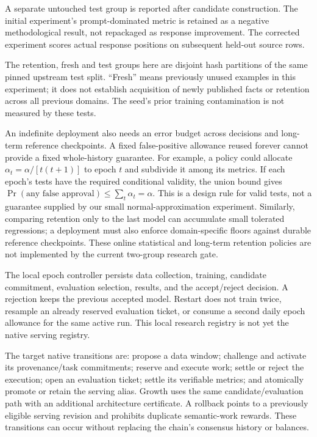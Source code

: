 \documentclass[11pt]{article}
\begin{document}
A separate untouched test group is reported after candidate construction. The initial experiment's prompt-dominated metric is retained as a negative methodological result, not repackaged as response improvement. The corrected experiment scores actual response positions on subsequent held-out source rows.

The retention, fresh and test groups here are disjoint hash partitions of the
same pinned upstream test split. ``Fresh'' means previously unused examples in
this experiment; it does not establish acquisition of newly published facts or
retention across all previous domains. The seed's prior training contamination
is not measured by these tests.

An indefinite deployment also needs an error budget across decisions and
long-term reference checkpoints. A fixed false-positive allowance reused
forever cannot provide a fixed whole-history guarantee. For example, a
policy could allocate $\alpha_t=\alpha/[t(t+1)]$ to epoch $t$ and subdivide it
among its metrics. If each epoch's tests have the required conditional validity,
the union bound gives $\Pr(\text{any false approval})\leq\sum_t\alpha_t=\alpha$.
This is a design rule for valid tests, not a guarantee supplied by our small
normal-approximation experiment. Similarly, comparing retention only to the
last model can accumulate small tolerated regressions; a deployment must also
enforce domain-specific floors against durable reference checkpoints. These
online statistical and long-term retention policies are not implemented by the
current two-group research gate.

The local epoch controller persists data collection, training, candidate commitment, evaluation selection, results, and the accept/reject decision. A rejection keeps the previous accepted model. Restart does not train twice, resample an already reserved evaluation ticket, or consume a second daily epoch allowance for the same active run. This local research registry is not yet the native serving registry.

The target native transitions are: propose a data window; challenge and activate its provenance/task commitments; reserve and execute work; settle or reject the execution; open an evaluation ticket; settle its verifiable metrics; and atomically promote or retain the serving alias. Growth uses the same candidate/evaluation path with an additional architecture certificate. A rollback points to a previously eligible serving revision and prohibits duplicate semantic-work rewards. These transitions can occur without replacing the chain's consensus history or balances.
\end{document}
